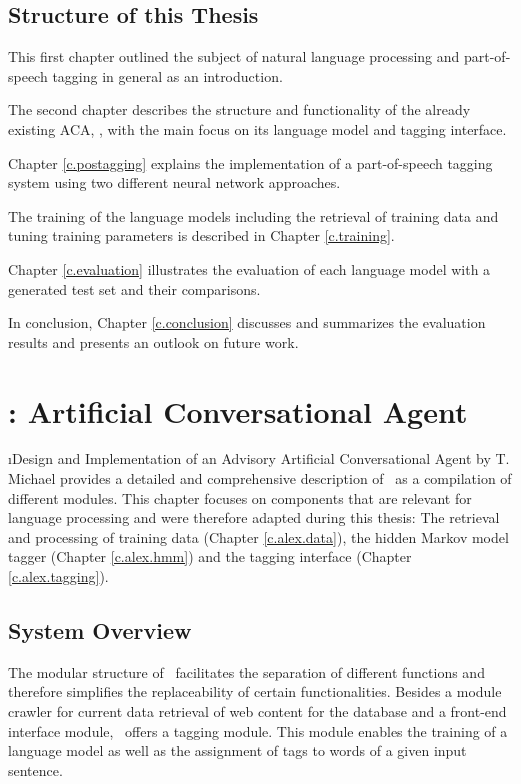 \section{Structure of this Thesis}\label{c.introduction.structure}
This first chapter outlined the subject of natural language processing and part-of-speech tagging in general as an introduction.

The second chapter describes the structure and functionality of the already existing ACA, \Alex, with the main focus on its language model and tagging interface.

Chapter \ref{c.postagging} explains the implementation of a part-of-speech tagging system using two different neural network approaches.

The training of the language models including the retrieval of training data and tuning training parameters is described in Chapter \ref{c.training}.

Chapter \ref{c.evaluation} illustrates the evaluation of each language model with a generated test set and their comparisons.

In conclusion, Chapter \ref{c.conclusion} discusses and summarizes the evaluation results and presents an outlook on future work.

\chapter{\Alex: Artificial Conversational Agent}\label{c.alex}
\i{Design and Implementation of an Advisory Artificial Conversational Agent} by T. Michael \cite{michael2016} provides a detailed and comprehensive description of \Alex\ as a compilation of different modules. This chapter focuses on components that are relevant for language processing and were therefore adapted during this thesis: The retrieval and processing of training data (Chapter \ref{c.alex.data}), the hidden Markov model tagger (Chapter \ref{c.alex.hmm}) and the tagging interface (Chapter \ref{c.alex.tagging}).

\section{System Overview}\label{c.alex.overview}
The modular structure of \Alex\ facilitates the separation of different functions and therefore simplifies the replaceability of certain functionalities. Besides a module crawler for current data retrieval of web content for the database and a front-end interface module, \Alex\ offers a tagging module. This module enables the training of a language model as well as the assignment of tags to words of a given input sentence.

